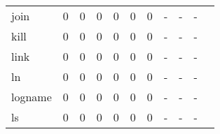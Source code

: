 \begin{longtable}{lp{1.20cm}p{1.20cm}p{1.20cm}p{1.20cm}p{1.20cm}p{1.20cm}p{1.20cm}p{1.20cm}p{1.20cm}p{1.20cm}}
join      &                                     0 &                                                  0 &                                                  0 &                                                  0 &                                                  0 &                                                  0 &                                             - &                                                  - &                                                  - \\
kill      &                                     0 &                                                  0 &                                                  0 &                                                  0 &                                                  0 &                                                  0 &                                             - &                                                  - &                                                  - \\
link      &                                     0 &                                                  0 &                                                  0 &                                                  0 &                                                  0 &                                                  0 &                                             - &                                                  - &                                                  - \\
ln        &                                     0 &                                                  0 &                                                  0 &                                                  0 &                                                  0 &                                                  0 &                                             - &                                                  - &                                                  - \\
logname   &                                     0 &                                                  0 &                                                  0 &                                                  0 &                                                  0 &                                                  0 &                                             - &                                                  - &                                                  - \\
ls        &                                     0 &                                                  0 &                                                  0 &                                                  0 &                                                  0 &                                                  0 &                                             - &                                                  - &                                                  - \\

\end{longtable}
